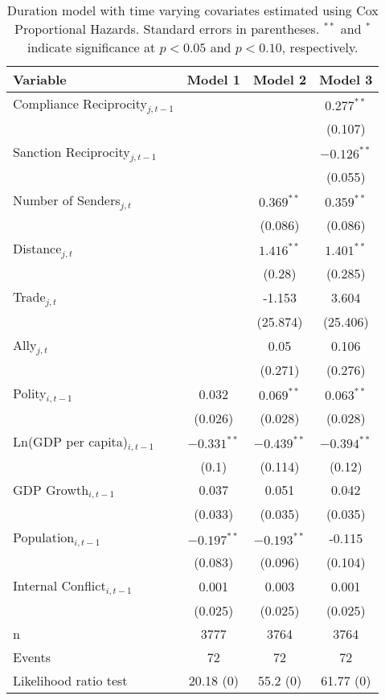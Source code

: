\begin{table}[ht]
\centering
{\normalsize
\begin{tabular}{lccc}
 Variable & Model 1 & Model 2 & Model 3 \\ 
  \hline
\hline
Compliance Reciprocity$_{j,t-1}$ &  &  & $0.277^{\ast\ast}$ \\ 
   &  &  & (0.107) \\ 
  Sanction Reciprocity$_{j,t-1}$ &  &  & $-0.126^{\ast\ast}$ \\ 
   &  &  & (0.055) \\ 
   \hline
Number of Senders$_{j,t}$ &  & $0.369^{\ast\ast}$ & $0.359^{\ast\ast}$ \\ 
   &  & (0.086) & (0.086) \\ 
  Distance$_{j,t}$ &  & $1.416^{\ast\ast}$ & $1.401^{\ast\ast}$ \\ 
   &  & (0.28) & (0.285) \\ 
  Trade$_{j,t}$ &  & -1.153 & 3.604 \\ 
   &  & (25.874) & (25.406) \\ 
  Ally$_{j,t}$ &  & 0.05 & 0.106 \\ 
   &  & (0.271) & (0.276) \\ 
   \hline
Polity$_{i,t-1}$ & 0.032 & $0.069^{\ast\ast}$ & $0.063^{\ast\ast}$ \\ 
   & (0.026) & (0.028) & (0.028) \\ 
  Ln(GDP per capita)$_{i,t-1}$ & $-0.331^{\ast\ast}$ & $-0.439^{\ast\ast}$ & $-0.394^{\ast\ast}$ \\ 
   & (0.1) & (0.114) & (0.12) \\ 
  GDP Growth$_{i,t-1}$ & 0.037 & 0.051 & 0.042 \\ 
   & (0.033) & (0.035) & (0.035) \\ 
  Population$_{i,t-1}$ & $-0.197^{\ast\ast}$ & $-0.193^{\ast\ast}$ & -0.115 \\ 
   & (0.083) & (0.096) & (0.104) \\ 
  Internal Conflict$_{i,t-1}$ & 0.001 & 0.003 & 0.001 \\ 
   & (0.025) & (0.025) & (0.025) \\ 
   \hline
n & 3777 & 3764 & 3764 \\ 
  Events & 72 & 72 & 72 \\ 
  Likelihood ratio test & 20.18 (0) & 55.2 (0) & 61.77 (0) \\ 
   \hline
\hline
\end{tabular}
}
\caption{Duration model with time varying covariates estimated using Cox Proportional Hazards. Standard errors in parentheses. $^{**}$ and $^{*}$ indicate significance at $p< 0.05 $ and $p< 0.10 $, respectively.} 
\label{tab:regResults}
\end{table}
